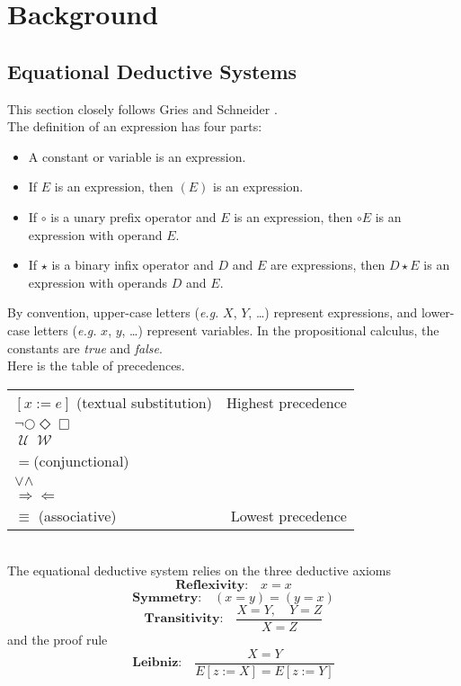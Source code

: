 \documentclass[fleqn, leqno]{article}
\newcommand{\impl}{\ensuremath{\Rightarrow}}        %
\newcommand{\foll}{\ensuremath{\Leftarrow}}         %
\newcommand{\Until}{\;\mathcal{U}\;}
\newcommand{\Wait}{\;\mathcal{W}\;}
\newcommand{\Next}{\bigcirc}
\newcommand{\Event}{\Diamond}
\newcommand{\Always}{\Box}
\begin{document}
\section{Background}

\subsection{Equational Deductive Systems}

This section closely follows Gries and Schneider \cite{LADM}.\\

The definition of an expression has four parts:
\begin{itemize}[$\bullet$]
\item A constant or variable is an expression.
\item If $E$ is an expression, then $(E)$ is an expression.
\item If $\circ$ is a unary prefix operator and $E$ is an expression, then $\circ E$ is an expression with operand $E$.
\item If $\star$ is a binary infix operator and $D$ and $E$ are expressions, then $D \star E$ is an expression with operands $D$
and $E$.
\end{itemize}

By convention, upper-case letters ({\itshape e.g.\/} $X$, $Y$, \dots) represent expressions,
and lower-case letters ({\itshape e.g.\/} $x$, $y$, \dots) represent variables.
In the propositional calculus, the constants are {\itshape true\/} and {\itshape false\/}.\\

Here is the table of precedences.\\

\setlength\extrarowheight{2pt}
\begin{tabular}{lr}
\hline
$[x := e]$ (textual substitution) & Highest precedence\\
$\neg$\quad $\Next$\quad $\Event$\quad $\Always$ &\\
$\Until$\quad $\Wait$ &\\
$=$\quad (conjunctional) &\\
$\lor$\quad $\land$ &\\
$\impl$\quad $\foll$ &\\
$\equiv$ \quad (associative) & Lowest precedence\\
\hline
\end{tabular}\\

The equational deductive system relies on the three deductive axioms
\[
\textbf{Reflexivity:}\quad x=x
\]
\[
\textbf{Symmetry:}\quad (x=y) = (y=x)
\]
\[
\textbf{Transitivity:}\quad \frac{X=Y, \quad Y=Z}{X=Z}
\]
and the proof rule
\[
\textbf{Leibniz:}\quad \frac{X=Y}{E[z:=X]=E[z:=Y]}
\]
\end{document}
